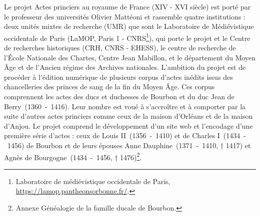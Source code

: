 \par Le projet \og Actes princiers au royaume de France (\textsc{XIV} - \textsc{XVI} siècle) \fg \space est porté par le professeur des universités Olivier Mattéoni et rassemble quatre institutions : deux unités mixtes de recherche (UMR) que sont le Laboratoire de Médiévistique occidentale de Paris (LaMOP, Paris 1 - CNRS\footnote{Laboratoire de médiévistique occidentale de Paris, \url{https://lamop.pantheonsorbonne.fr/}.}), qui porte le projet et le Centre de recherches historiques (CRH, CNRS - EHESS), le centre de recherche de l'École Nationale des Chartes, Centre Jean Mabillon, et le département du Moyen Âge et de l’Ancien régime des Archives nationales. L'ambition du projet est de procéder à l’édition numérique de plusieurs corpus d’actes inédits issus des chancelleries des princes de sang de la fin du Moyen Âge. Ces corpus comprennent les actes des ducs et duchesses de Bourbon et du duc Jean de Berry~(1360~-~1416). Leur nombre est voué à s'accroître et à comporter par la suite d'autres actes princiers comme ceux de la maison d'Orléans et de la maison d'Anjou. Le projet comprend le développement d’un site web et l’encodage d’une première série d’actes : ceux de Louis \textsc{II}~(1356~-~1410) et de Charles I~(1434~-~1456) de Bourbon et de leurs épouses Anne Dauphine~(1371~-~1410, † 1417) et Agnès de Bourgogne~(1434~-~1456, † 1476)\footnote{Annexe Généalogie de la famille ducale de Bourbon.}. 
\newpage 

